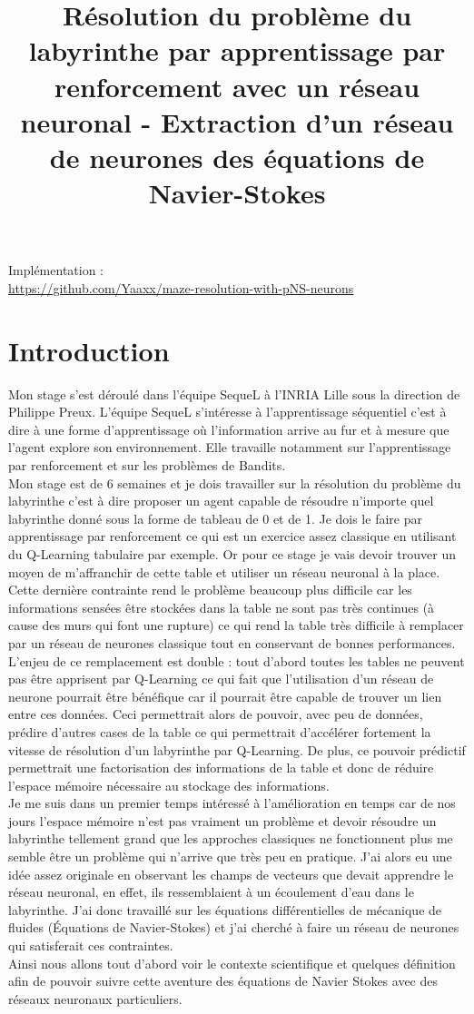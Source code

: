 \documentclass[10pt]{article}
\title{Résolution du problème du labyrinthe par apprentissage par renforcement avec un réseau neuronal - Extraction d'un réseau de neurones des équations de Navier-Stokes}
\begin{document}
\maketitle

Implémentation : \\
\url{https://github.com/Yaaxx/maze-resolution-with-pNS-neurons}


\section{Introduction}
Mon stage s'est déroulé dans l'équipe SequeL à l'INRIA Lille sous la direction de Philippe Preux. L'équipe SequeL s'intéresse à l'apprentissage séquentiel c'est à dire à une forme d'apprentissage où l'information arrive au fur et à mesure que l'agent explore son environnement. Elle travaille notamment sur l'apprentissage par renforcement et sur les problèmes de Bandits.\\
Mon stage est de 6 semaines et je dois travailler sur la résolution du problème du labyrinthe c'est à dire proposer un agent capable de résoudre n'importe quel labyrinthe donné sous la forme de tableau de 0 et de 1. Je dois le faire par apprentissage par renforcement ce qui est un exercice assez classique en utilisant du Q-Learning tabulaire par exemple. Or pour ce stage je vais devoir trouver un moyen de m'affranchir de cette table et utiliser un réseau neuronal à la place. Cette dernière contrainte rend le problème beaucoup plus difficile car les informations sensées être stockées dans la table ne sont pas très continues (à cause des murs qui font une rupture) ce qui rend la table très difficile à remplacer par un réseau de neurones classique tout en conservant de bonnes performances.
L'enjeu de ce remplacement est double : tout d'abord toutes les tables ne peuvent pas être apprisent par Q-Learning ce qui fait que l'utilisation d'un réseau de neurone pourrait être bénéfique car il pourrait être capable de trouver un lien entre ces données. Ceci permettrait alors de pouvoir, avec peu de données, prédire d'autres cases de la table ce qui permettrait d'accélérer fortement la vitesse de résolution d'un labyrinthe par Q-Learning. De plus, ce pouvoir prédictif permettrait une factorisation des informations de la table et donc de réduire l'espace mémoire nécessaire au stockage des informations.\\
Je me suis dans un premier temps intéressé à l'amélioration en temps car de nos jours l'espace mémoire n'est pas vraiment un problème et devoir résoudre un labyrinthe tellement grand que les approches classiques ne fonctionnent plus me semble être un problème qui n'arrive que très peu en pratique. J'ai alors eu une idée assez originale en observant les champs de vecteurs que devait apprendre le réseau neuronal, en effet, ils ressemblaient à un écoulement d'eau dans le labyrinthe. J'ai donc travaillé sur les équations différentielles de mécanique de fluides (Équations de Navier-Stokes) et j'ai cherché à faire un réseau de neurones qui satisferait ces contraintes.\\
Ainsi nous allons tout d'abord voir le contexte scientifique et quelques définition afin de pouvoir suivre cette aventure des équations de Navier Stokes avec des réseaux neuronaux particuliers.
\end{document}
